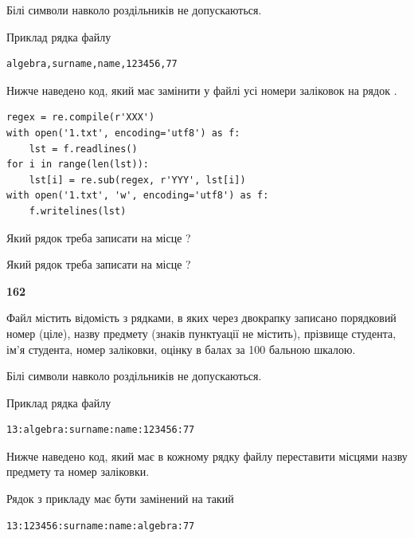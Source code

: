 Білі символи навколо роздільників не допускаються.

Приклад рядка файлу



\begin{verbatim}
algebra,surname,name,123456,77
\end{verbatim}


Нижче наведено код, який має замінити у файлі усі номери заліковок на рядок \code{***}.



\begin{verbatim}
regex = re.compile(r'XXX')
with open('1.txt', encoding='utf8') as f:
    lst = f.readlines()
for i in range(len(lst)):
    lst[i] = re.sub(regex, r'YYY', lst[i])
with open('1.txt', 'w', encoding='utf8') as f:
    f.writelines(lst)
\end{verbatim}







Який рядок треба записати на місце  ?\par
\vspace{5mm}


Який рядок треба записати на місце  ?\par


\newpage

{\begin {center}\textbf{ 162}\end {center}}\par
Файл  містить відомість з рядками, в яких через двокрапку записано поряд\-ковий номер (ціле), назву предмету (знаків пунктуації не містить), прізвище студента, ім'я студента, номер заліковки, оцінку в балах за 100 бальною шкалою.

Білі символи навколо роздільників не допускаються.

Приклад рядка файлу



\begin{verbatim}
13:algebra:surname:name:123456:77
\end{verbatim}


Нижче наведено код, який має в кожному рядку файлу переставити місцями назву предмету та номер заліковки.

Рядок з прикладу має бути замінений на такий



\begin{verbatim}
13:123456:surname:name:algebra:77
\end{verbatim}




